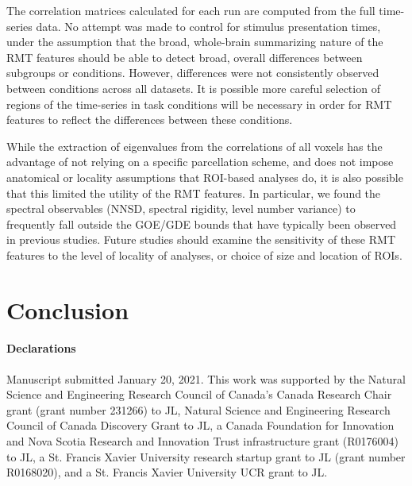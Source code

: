 The correlation matrices calculated for each run are computed from the full time-series data. No
attempt was made to control for stimulus presentation times, under the assumption that the broad,
whole-brain summarizing nature of the RMT features should be able to detect broad, overall
differences between subgroups or conditions. However, differences were not consistently observed
between conditions across all datasets. It is possible more careful selection of regions of the
time-series in task conditions will be necessary in order for RMT features to reflect the
differences between these conditions.

While the extraction of eigenvalues from the correlations of all voxels has the advantage of not
relying on a specific parcellation scheme, and does not impose anatomical or locality assumptions
that ROI-based analyses do, it is also possible that this limited the utility of the RMT features.
In particular, we found the spectral observables (NNSD, spectral rigidity, level number variance) to
frequently fall outside the GOE/GDE bounds that have typically been observed in previous studies.
Future studies should examine the sensitivity of these RMT features to the level of locality of
analyses, or choice of size and location of ROIs.

\section{Conclusion}


\paragraph{Declarations}
Manuscript submitted January 20, 2021. This work was supported by the  Natural Science and
Engineering Research Council of Canada's Canada Research Chair grant (grant number 231266) to JL,
Natural Science and Engineering Research Council of Canada Discovery Grant to JL, a Canada
Foundation for Innovation and Nova Scotia Research and Innovation Trust infrastructure grant
(R0176004) to JL, a St. Francis Xavier University research startup grant to JL (grant number
R0168020), and a St. Francis Xavier University UCR grant to JL.



